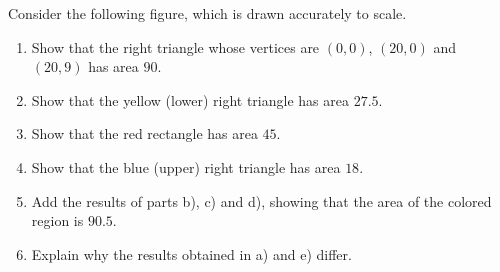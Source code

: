 \documentclass[11pt, a4paper, tikz]{article}
\begin{document}
	\begin{formulationBox}
		Consider the following figure, which is drawn accurately to scale.
		
		
		\begin{enumerate}[label=\alph*)]
			\item Show that the right triangle whose vertices are $(0,0)$, $(20, 0)$ and $(20, 9)$ has area $90$.
			\item Show that the yellow (lower) right triangle has area $27.5$.
			\item Show that the red rectangle has area $45$.
			\item Show that the blue (upper) right triangle has area $18$.
			\item Add the results of parts b), c) and d), showing that the area of the colored region is $90.5$.
			\item Explain why the results obtained in a) and e) differ.
		\end{enumerate}
	\end{formulationBox}
\end{document}
